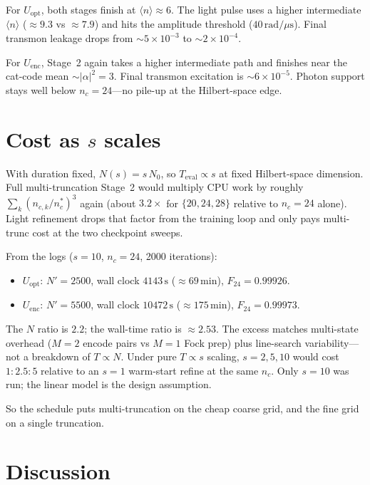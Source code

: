 \documentclass[11pt]{article}
\begin{document}
For $U_{\mathrm{opt}}$, both stages finish at $\langle n\rangle\approx 6$.
The light pulse uses a higher intermediate $\langle n\rangle$
($\approx 9.3$ vs $\approx 7.9$) and hits the amplitude threshold
($40\,\mathrm{rad}/\mu\mathrm{s}$). Final transmon leakage drops from
$\sim 5\times 10^{-3}$ to $\sim 2\times 10^{-4}$.

For $U_{\mathrm{enc}}$, Stage~2 again takes a higher intermediate path and
finishes near the cat-code mean $\sim|\alpha|^2=3$. Final transmon excitation
is $\sim 6\times 10^{-5}$. Photon support stays well below $n_c=24$---no
pile-up at the Hilbert-space edge.

\section{Cost as $s$ scales}
\label{sec:cost}

With duration fixed, $N(s)=s\,N_0$, so $T_{\mathrm{eval}}\propto s$ at fixed
Hilbert-space dimension. Full multi-truncation Stage~2 would multiply CPU
work by roughly $\sum_k(n_{c,k}/n_c^*)^3$ again (about $3.2\times$ for
$\{20,24,28\}$ relative to $n_c=24$ alone). Light refinement drops that
factor from the training loop and only pays multi-trunc cost at the two
checkpoint sweeps.

From the logs ($s=10$, $n_c=24$, 2000 iterations):
\begin{itemize}
  \item $U_{\mathrm{opt}}$: $N'=2500$, wall clock $4143\,\mathrm{s}$
        ($\approx 69\,\mathrm{min}$), $F_{24}=0.99926$.
  \item $U_{\mathrm{enc}}$: $N'=5500$, wall clock $10472\,\mathrm{s}$
        ($\approx 175\,\mathrm{min}$), $F_{24}=0.99973$.
\end{itemize}
The $N$ ratio is $2.2$; the wall-time ratio is $\approx 2.53$. The excess
matches multi-state overhead ($M=2$ encode pairs vs $M=1$ Fock prep) plus
line-search variability---not a breakdown of $T\propto N$. Under pure
$T\propto s$ scaling, $s=2,5,10$ would cost $1:2.5:5$ relative to an
$s=1$ warm-start refine at the same $n_c$. Only $s=10$ was run; the linear
model is the design assumption.

So the schedule puts multi-truncation on the cheap coarse grid, and the fine
grid on a single truncation.

\section{Discussion}
\label{sec:discussion}
\end{document}
